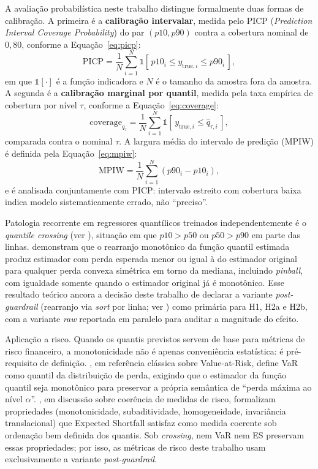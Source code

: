 A avaliação probabilística neste trabalho distingue formalmente duas formas de calibração. A primeira é a \textbf{calibração intervalar}, medida pelo PICP (\textit{Prediction Interval Coverage Probability}) do par $(p10, p90)$ contra a cobertura nominal de $0{,}80$, conforme a Equação~\ref{eq:picp}:
\begin{equation}
    \mathrm{PICP} = \frac{1}{N}\sum_{i=1}^{N} \mathbb{1}\!\left[\,p10_i \leq y_{\text{true},i} \leq p90_i\,\right],
    \label{eq:picp}
\end{equation}
em que $\mathbb{1}[\cdot]$ é a função indicadora e $N$ é o tamanho da amostra fora da amostra. A segunda é a \textbf{calibração marginal por quantil}, medida pela taxa empírica de cobertura por nível $\tau$, conforme a Equação~\ref{eq:coverage}:
\begin{equation}
    \mathrm{coverage}_{q_\tau} = \frac{1}{N}\sum_{i=1}^{N} \mathbb{1}\!\left[\,y_{\text{true},i} \leq \hat{q}_{\tau,i}\,\right],
    \label{eq:coverage}
\end{equation}
comparada contra o nominal $\tau$. A largura média do intervalo de predição (MPIW) é definida pela Equação~\ref{eq:mpiw}:
\begin{equation}
    \mathrm{MPIW} = \frac{1}{N}\sum_{i=1}^{N} \left(p90_i - p10_i\right),
    \label{eq:mpiw}
\end{equation}
e é analisada conjuntamente com PICP: intervalo estreito com cobertura baixa indica modelo sistematicamente errado, não ``preciso''.

Patologia recorrente em regressores quantílicos treinados independentemente é o \textit{quantile crossing} (ver ), situação em que $p10 > p50$ ou $p50 > p90$ em parte das linhas. \cite{CHERNOZHUKOV2010REARRANGEMENT} demonstram que o rearranjo monotônico da função quantil estimada produz estimador com perda esperada menor ou igual à do estimador original para qualquer perda convexa simétrica em torno da mediana, incluindo \textit{pinball}, com igualdade somente quando o estimador original já é monotônico. Esse resultado teórico ancora a decisão deste trabalho de declarar a variante \textit{post-guardrail} (rearranjo via \textit{sort} por linha; ver ) como primária para H1, H2a e H2b, com a variante \textit{raw} reportada em paralelo para auditar a magnitude do efeito.

Aplicação a risco. Quando os quantis previstos servem de base para métricas de risco financeiro, a monotonicidade não é apenas conveniência estatística: é pré-requisito de definição. \cite{JORION2007}, em referência clássica sobre Value-at-Risk, define VaR como quantil da distribuição de perda, exigindo que o estimador da função quantil seja monotônico para preservar a própria semântica de ``perda máxima ao nível $\alpha$''. \cite{ACERBI2002}, em discussão sobre coerência de medidas de risco, formalizam propriedades (monotonicidade, subaditividade, homogeneidade, invariância translacional) que Expected Shortfall satisfaz como medida coerente sob ordenação bem definida dos quantis. Sob \textit{crossing}, nem VaR nem ES preservam essas propriedades; por isso, as métricas de risco deste trabalho usam exclusivamente a variante \textit{post-guardrail}.

